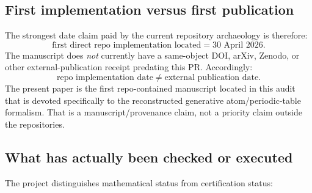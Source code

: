 \documentclass[11pt,a4paper]{article}
\theoremstyle{remark}
\begin{document}
\subsection{First implementation versus first publication}

The strongest date claim paid by the current repository archaeology is therefore:
\[
\boxed{\text{first direct repo implementation located} = \text{30 April 2026}.}
\]
The manuscript does \emph{not} currently have a same-object DOI, arXiv, Zenodo,
or other external-publication receipt predating this PR.  Accordingly:
\[
\boxed{\text{repo implementation date}\neq\text{external publication date}.}
\]
The present paper is the first repo-contained manuscript located in this audit
that is devoted specifically to the reconstructed generative atom/periodic-table
formalism.  That is a manuscript/provenance claim, not a priority claim outside
the repositories.

\subsection{What has actually been checked or executed}

The project distinguishes mathematical status from certification status:
\end{document}
